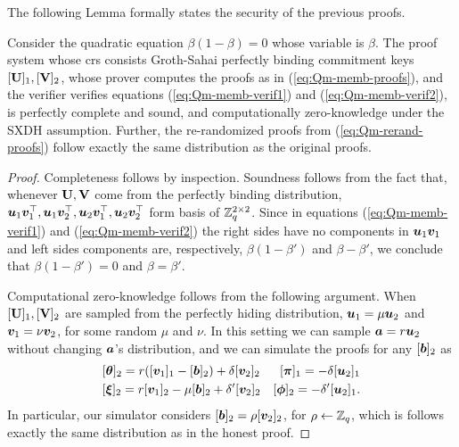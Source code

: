  The following Lemma formally states the security of the previous proofs.
\begin{lemma} \label{lemma:Qm-memb}
Consider the quadratic equation $\beta(1-\beta) = 0$ whose variable is $\beta$. 
The proof system whose crs consists Groth-Sahai perfectly binding commitment keys $[\mathbf{{U}}]_1,[\mathbf{{V}}]_2$, whose prover computes the proofs as in (\ref{eq:Qm-memb-proofs}), and the verifier verifies equations (\ref{eq:Qm-memb-verif1}) and (\ref{eq:Qm-memb-verif2}), is perfectly complete and sound, and computationally zero-knowledge under the SXDH assumption.
Further, the re-randomized proofs from (\ref{eq:Qm-rerand-proofs}) follow exactly the same distribution as the original proofs.
\end{lemma}
\begin{proof}
Completeness follows by inspection. Soundness follows from the fact that, whenever $\mathbf{{U}},\mathbf{{V}}$ come from the perfectly binding distribution, ${\boldsymbol{u}}_1{\boldsymbol{v}}_1^\top,{\boldsymbol{u}}_1{\boldsymbol{v}}_2^\top,\allowbreak{\boldsymbol{u}}_2{\boldsymbol{v}}_1^\top,\allowbreak{\boldsymbol{u}}_2{\boldsymbol{v}}_2^\top$ form basis of $\mathbb{Z}_q^{2\times 2}$. Since in equations (\ref{eq:Qm-memb-verif1}) and (\ref{eq:Qm-memb-verif2}) the right sides have no components in ${\boldsymbol{u}}_1{\boldsymbol{v}}_1$ and left sides components are, respectively, $\beta(1-\beta')$ and $\beta-\beta'$, we conclude that $\beta(1-\beta') = 0$ and $\beta=\beta'$.

Computational zero-knowledge follows from the following argument.
When $[\mathbf{{U}}]_1,[\mathbf{{V}}]_2$ are sampled from the perfectly hiding distribution, ${\boldsymbol{u}}_1 = \mu{\boldsymbol{u}}_2$ and ${\boldsymbol{v}}_1 = \nu{\boldsymbol{v}}_2$, for some random $\mu$ and $\nu$. In this setting we can sample ${\boldsymbol{a}} = r{\boldsymbol{u}}_2$ without changing ${\boldsymbol{a}}$'s distribution, and we can simulate the proofs for any $[{\boldsymbol{b}}]_2$ as 
\begin{align} \label{eq:Qm-sim-proofs}
&[{\boldsymbol{\theta}}]_2 = r([{\boldsymbol{v}}_1]_1-[{\boldsymbol{b}}]_2)+\delta[{\boldsymbol{v}}_2]_2
&[{\boldsymbol{\pi}}]_1 = -\delta[{\boldsymbol{u}}_2]_1 \nonumber\\
&[{\boldsymbol{\xi}}]_2 = r[{\boldsymbol{v}}_1]_2-\mu[{\boldsymbol{b}}]_2+\delta'[{\boldsymbol{v}}_2]_2
&[{\boldsymbol{\phi}}]_2 = -\delta'[{\boldsymbol{u}}_2]_1.
\end{align} 
In particular, our simulator considers $[{\boldsymbol{b}}]_2=\rho[{\boldsymbol{v}}_2]_2$, for $\rho\gets\mathbb{Z}_q$, which is follows exactly the same distribution as in the honest proof.


\end{proof}

